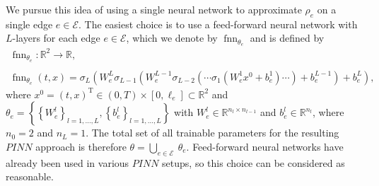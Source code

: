 We pursue this idea of using a single neural network to approximate $\rho_e$ on a single edge $e \in \mathcal{E}$. The easiest choice is to use a feed-forward neural network with $L$-layers for each edge $e \in \mathcal{E}$, which we denote by $\operatorname{fnn}_{\theta_e}$ and is defined by 
\begin{equation} 
    \label{one_for_each}
    \begin{gathered}
        \operatorname{fnn}_{\theta_e} \colon \mathbb{R}^2 \to \mathbb{R}, \\
        \\
        \operatorname{fnn}_{\theta_e}\left(t, x\right) = \sigma_L\left(W^L_e \sigma_{L-1}\left(W^{L-1}_e\sigma_{L-2}\left(\cdots \sigma_{1}\left(W^{1}_e x^0 +b^1_e\right) \cdots\right) + b^{L-1}_e\right) + b^{L}_e\right),
    \end{gathered} 
\end{equation} 
where $x^0 = \left(t, x\right)^{\mathrm{T}} \in \left(0, T\right) \times \left[0, \ell_e\right] \subset \mathbb{R}^2$ and $\theta_e = \left\{ \left\{ W^l_e \right\}_{l = 1, \ldots, L}, \left\{ b^l_e \right\}_{l = 1, \ldots, L} \right\}$ with $W^l_e \in \mathbb{R}^{n_l \times n_{l-1}}$ and $b^l_e \in \mathbb{R}^{n_l}$, where $n_0 = 2$ and $n_L = 1$. The total set of all trainable parameters for the resulting $PINN$ approach is therefore $\theta = \bigcup_{e \in \mathcal{E}} \ \theta_e$. Feed-forward neural networks have already been used in various $PINN$ setups, so this choice can be considered as reasonable. \\

